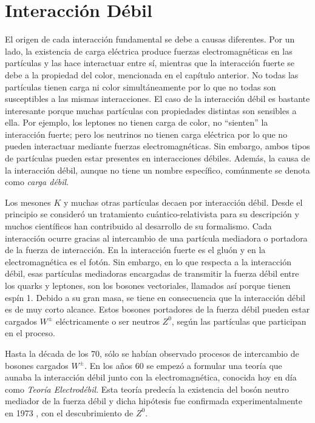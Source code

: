 \chapter{Interacción Débil}\label{cap:weak_int}
El origen de cada interacción fundamental se debe a causas diferentes. Por un lado, la existencia de carga eléctrica produce fuerzas electromagnéticas en las partículas y las hace interactuar entre sí, mientras que la interacción fuerte se debe a la propiedad del color, mencionada en el capítulo anterior. No todas las partículas tienen carga ni color simultáneamente por lo que no todas son susceptibles a las mismas interacciones. El caso de la interacción débil es bastante interesante porque muchas partículas con propiedades distintas son sensibles a ella. Por ejemplo, los leptones no tienen carga de color, no ``sienten'' la interacción fuerte; pero los neutrinos no tienen carga eléctrica por lo que no pueden interactuar mediante fuerzas electromagnéticas. Sin embargo, ambos tipos de partículas pueden estar presentes en interacciones débiles.\cite{Griffiths2008} Además, la causa de la interacción débil, aunque no tiene un nombre específico, comúnmente se denota como \textit{carga débil}.

Los mesones $K$ y muchas otras partículas decaen por interacción débil. Desde el principio se consideró un tratamiento cuántico-relativista para su descripción y muchos científicos han contribuido al desarrollo de su formalismo. Cada interacción ocurre gracias al intercambio de una partícula mediadora o portadora de la fuerza de interacción. En la interacción fuerte es el gluón y en la electromagnética es el fotón. Sin embargo, en lo que respecta a la interacción débil, esas partículas mediadoras encargadas de transmitir la fuerza débil entre los quarks y leptones, son los bosones vectoriales, llamados así porque tienen espín 1. Debido a su gran masa, se tiene en consecuencia que la interacción débil es de muy corto alcance. Estos bosones portadores de la fuerza débil pueden estar cargados $W^{\pm}$ eléctricamente o ser neutros $Z^0$, según las partículas que participan en el proceso. 

Hasta la década de los 70, sólo se habían observado procesos de intercambio de bosones cargados $W^{\pm}$. En los años 60 se empezó a formular una teoría que aunaba la interacción débil junto con la electromagnética, conocida hoy en día como \textit{Teoría Electrodébil}. Esta teoría predecía la existencia del bosón neutro mediador de la fuerza débil y dicha hipótesis fue confirmada experimentalmente en 1973 \cite{BrianM}, con el descubrimiento de $Z^0$.

